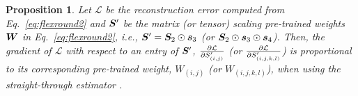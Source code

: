 \documentclass{article}
\theoremstyle{plain}
\newtheorem{proposition}[theorem]{Proposition}
\theoremstyle{definition}
\theoremstyle{remark}
\begin{document}



\begin{proposition}\label{prop}
    Let $\mathcal{L}$ be the reconstruction error computed from Eq.~\ref{eq:flexround2} and ${\bm{S}}'$ be the matrix (or tensor) scaling pre-trained weights ${\bm{W}}$ in Eq.~\ref{eq:flexround2}, i.e., ${\bm{S}}' = {\bm{S}}_2 \odot {\bm{s}}_3$ (or ${\bm{S}}_2 \odot {\bm{s}}_3 \odot {\bm{s}}_4$). Then, the gradient of $\mathcal{L}$ with respect to an entry of ${\bm{S}}'$, ${{\partial\mathcal{L}} \over {\partial S'_{(i, j)}}}$ (or ${{\partial\mathcal{L}} \over {\partial S'_{(i, j, k, l)}}}$) is proportional to its corresponding pre-trained weight, $W_{(i, j)}$ (or $W_{(i, j, k, l)}$), when using the straight-through estimator \citep{Bengio2013ste}.
\end{proposition}
\end{document}
